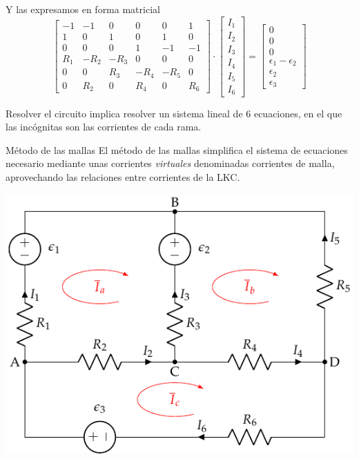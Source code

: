 \documentclass[xcolor={usenames,svgnames,dvipsnames}]{beamer}
\begin{document}
\begin{frame}[label={sec:org06a484f}]{Y las expresamos en forma matricial}
\begin{equation*}
  \begin{bmatrix}
    -1 & -1 & 0 & 0 & 0 & 1\\
    1 & 0 & 1 & 0 & 1 & 0\\
    0 & 0 & 0 & 1 & -1 & -1\\
    R_1 & -R_2 & - R_3 & 0 & 0 & 0\\
    0 & 0 & R_3 & - R_4 & - R_5 & 0\\
    0 & R_2 & 0 & R_4 & 0 & R_6
  \end{bmatrix} \cdot %
  \begin{bmatrix}
    I_1\\
    I_2\\
    I_3\\
    I_4\\
    I_5\\
    I_6    
  \end{bmatrix} = %
  \begin{bmatrix}
    0\\
    0\\
    0\\
    \epsilon_1 - \epsilon_2\\
    \epsilon_2\\
    \epsilon_3
  \end{bmatrix}
\end{equation*}

Resolver el circuito implica resolver un sistema lineal de 6 ecuaciones, en el que las incógnitas son las corrientes de cada rama.
\end{frame}
\begin{frame}[label={sec:org8672fce}]{Método de las mallas}
El método de las mallas simplifica el sistema de ecuaciones necesario mediante unas corrientes \emph{virtuales} denominadas \alert{corrientes de malla}, aprovechando las relaciones entre corrientes de la LKC.

\begin{center}
\includegraphics[height=0.7\textheight]{figs/mallas1_corrientes.pdf}
\end{center}
\end{frame}
\end{document}
